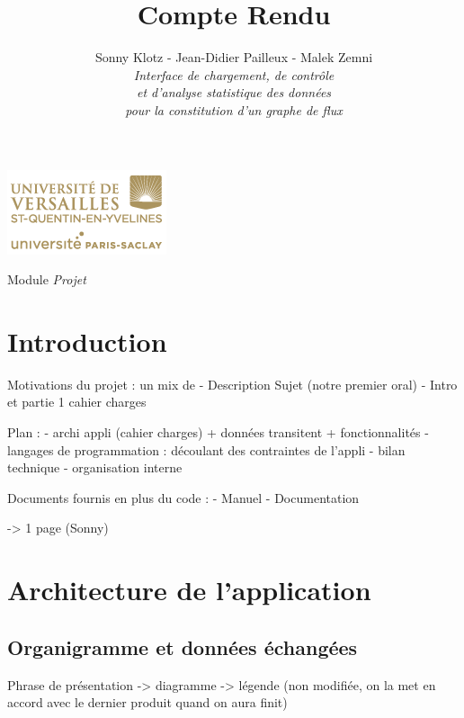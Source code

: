 

\title{\vspace{\fill}\textbf{\Huge Compte Rendu}}
\author{
	Sonny Klotz - Jean-Didier Pailleux - Malek Zemni
	\vspace{2em}\\
	\textit{Interface de chargement, de contrôle}\\\textit{et d’analyse statistique des données}\\\textit{pour la constitution d’un graphe de flux}
	\vspace{2em}
}


\clearpage
\maketitle\vspace{9em}
\begin{center}\includegraphics[scale=0.7]{../Cahier/logo.png}\end{center}
\begin{flushright}Module \textit{Projet}\end{flushright}
\newpage
\tableofcontents
\newpage\clearpage{}

	\section*{Introduction}
		Motivations du projet : un mix de
			- Description Sujet (notre premier oral)
			- Intro et partie 1 cahier charges
		
		Plan :
			- archi appli (cahier charges) + données transitent + fonctionnalités
			- langages de programmation : découlant des contraintes de l'appli
			- bilan technique
			- organisation interne
			
		Documents fournis en plus du code :
			- Manuel
			- Documentation
			
		-> 1 page (Sonny)
	
	\section{Architecture de l'application}
		\subsection{Organigramme et données échangées}
			Phrase de présentation -> diagramme -> légende (non modifiée, on la met en accord avec le dernier produit quand on aura finit)
